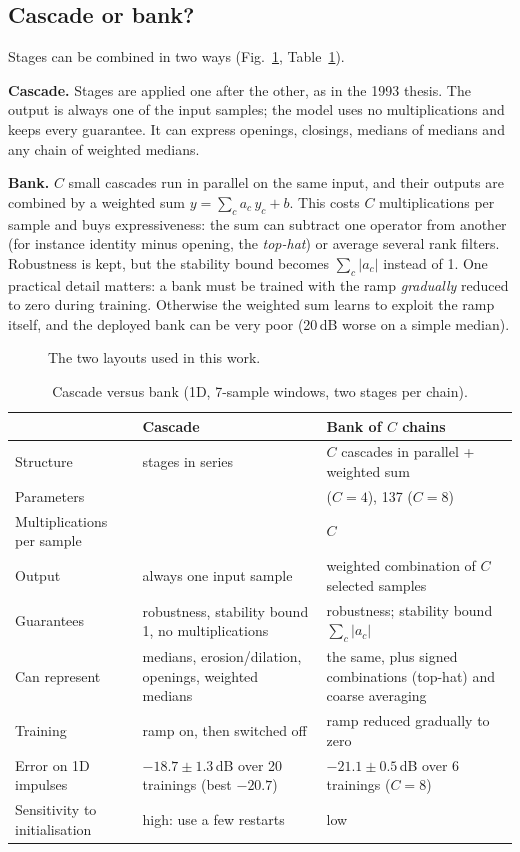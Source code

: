 \documentclass[11pt,a4paper]{article}
\begin{document}
\subsection{Cascade or bank?}\label{sec:arch}
Stages can be combined in two ways (Fig.~\ref{fig:arch}, Table~\ref{tab:arch}).

\textbf{Cascade.} Stages are applied one after the other, as in the 1993 thesis. The output is always one of the input
samples; the model uses no multiplications and keeps every guarantee. It can express openings, closings, medians of
medians and any chain of weighted medians.

\textbf{Bank.} $C$ small cascades run in parallel on the same input, and their outputs are combined by a weighted sum
$y=\sum_c a_c\,y_c+b$. This costs $C$ multiplications per sample and buys expressiveness: the sum can subtract one
operator from another (for instance identity minus opening, the \emph{top-hat}) or average several rank filters.
Robustness is kept, but the stability bound becomes $\sum_c|a_c|$ instead of 1. One practical detail matters: a bank
must be trained with the ramp \emph{gradually} reduced to zero during training. Otherwise the weighted sum learns to
exploit the ramp itself, and the deployed bank can be very poor (20\,dB worse on a simple median).

\begin{figure}[h]\centering
\resizebox{0.95\linewidth}{!}{}
\caption{The two layouts used in this work.}\label{fig:arch}
\end{figure}

\begin{table}[h]\centering\small
\caption{Cascade versus bank (1D, 7-sample windows, two stages per chain).}\label{tab:arch}
\begin{tabularx}{\linewidth}{@{}l>{\raggedright\arraybackslash}X>{\raggedright\arraybackslash}X@{}}\toprule
 & \textbf{Cascade} & \textbf{Bank of $C$ chains} \\\midrule
Structure & stages in series & $C$ cascades in parallel + weighted sum \\
Parameters & 16 & 69 ($C{=}4$), 137 ($C{=}8$) \\
Multiplications per sample & 0 & $C$ \\
Output & always one input sample & weighted combination of $C$ selected samples \\
Guarantees & robustness, stability bound 1, no multiplications & robustness; stability bound $\sum_c|a_c|$ \\
Can represent & medians, erosion/dilation, openings, weighted medians & the same, plus signed combinations (top-hat) and coarse averaging \\
Training & ramp on, then switched off & ramp reduced gradually to zero \\
Error on 1D impulses & $-18.7\pm1.3$\,dB over 20 trainings (best $-20.7$) & $-21.1\pm0.5$\,dB over 6 trainings ($C{=}8$)\\
Sensitivity to initialisation & high: use a few restarts & low \\
\bottomrule\end{tabularx}
\end{table}
\end{document}
